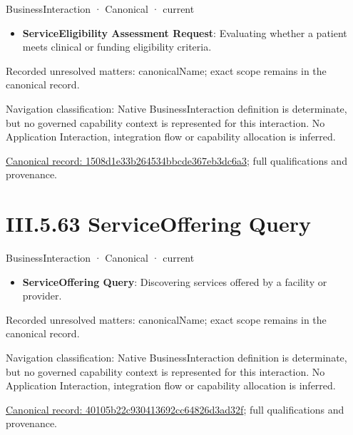 \label{element:1508d1e33b264534bbcde367eb3dc6a3}
{\small BusinessInteraction · Canonical · current}\par

\begin{itemize}


\item \textbf{ServiceEligibility Assessment Request}: Evaluating whether a patient meets clinical or funding eligibility criteria.

\end{itemize}

{\small Recorded unresolved matters: canonicalName; exact scope remains in the canonical record.}\par
{\small Navigation classification: Native BusinessInteraction definition is determinate, but no governed capability context is represented for this interaction. No Application Interaction, integration flow or capability allocation is inferred.}\par
{\footnotesize \href{../../../../../../../continuum/business/business-interaction/1508d1e33b264534bbcde367eb3dc6a3.md}{Canonical record: 1508d1e33b264534bbcde367eb3dc6a3}; full qualifications and provenance.}\par
\section*{III.5.63 ServiceOffering Query}
\label{navigation:III.5.63}

\label{element:40105b22c930413692cc64826d3ad32f}
{\small BusinessInteraction · Canonical · current}\par

\begin{itemize}


\item \textbf{ServiceOffering Query}: Discovering services offered by a facility or provider.

\end{itemize}

{\small Recorded unresolved matters: canonicalName; exact scope remains in the canonical record.}\par
{\small Navigation classification: Native BusinessInteraction definition is determinate, but no governed capability context is represented for this interaction. No Application Interaction, integration flow or capability allocation is inferred.}\par
{\footnotesize \href{../../../../../../../continuum/business/business-interaction/40105b22c930413692cc64826d3ad32f.md}{Canonical record: 40105b22c930413692cc64826d3ad32f}; full qualifications and provenance.}\par

